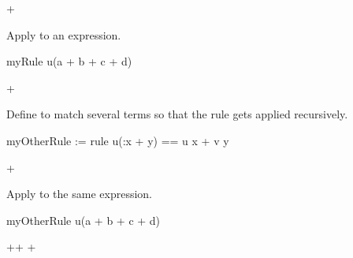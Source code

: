{\begin{xtc}
\begin{TeXOutput}
\begin{fricasmath}{22}
\SYMBOL{\ ==\ }+%
\end{fricasmath}
\end{TeXOutput}
\end{xtc}
\begin{xtc}
\begin{xtccomment}
Apply  to an expression.
\end{xtccomment}
\begin{spadsrc}
myRule u(a + b + c + d) 
\end{spadsrc}
\begin{TeXOutput}
\begin{fricasmath}{23}
+%
\end{fricasmath}
\end{TeXOutput}
\end{xtc}
\begin{xtc}
\begin{xtccomment}
Define  to match several terms
so that the rule gets applied recursively.
\end{xtccomment}
\begin{spadsrc}
myOtherRule := rule u(:x + y) == u x + v y 
\end{spadsrc}
\begin{TeXOutput}
\begin{fricasmath}{24}
\SYMBOL{\ ==\ }+%
\end{fricasmath}
\end{TeXOutput}
\end{xtc}
\begin{xtc}
\begin{xtccomment}
Apply  to the same expression.
\end{xtccomment}
\begin{spadsrc}
myOtherRule u(a + b + c + d) 
\end{spadsrc}
\begin{TeXOutput}
\begin{fricasmath}{25}
++%
+%
\end{fricasmath}
\end{TeXOutput}
\end{xtc}

}
